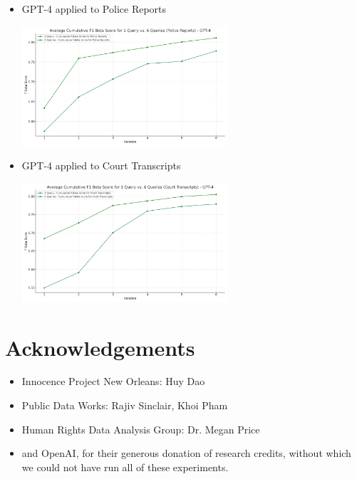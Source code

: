 \documentclass{article}
\begin{document}
\begin{itemize}
\item GPT-4 applied to Police Reports

\begin{center}
    \includegraphics[width=0.6\textwidth]{data/police_reports_graph_gpt-4.png}
\end{center}

\item GPT-4 applied to Court Transcripts

\begin{center}
    \includegraphics[width=0.6\textwidth]{data/court_transcripts_graph_gpt-4.png}
\end{center}

\end{itemize}

\section{Acknowledgements}

\begin{itemize}
\item Innocence Project New Orleans: Huy Dao
\item Public Data Works: Rajiv Sinclair, Khoi Pham
\item Human Rights Data Analysis Group: Dr. Megan Price
\item and OpenAI, for their generous donation of research credits, without which we could not have run all of these experiments.
\end{itemize}
\end{document}
